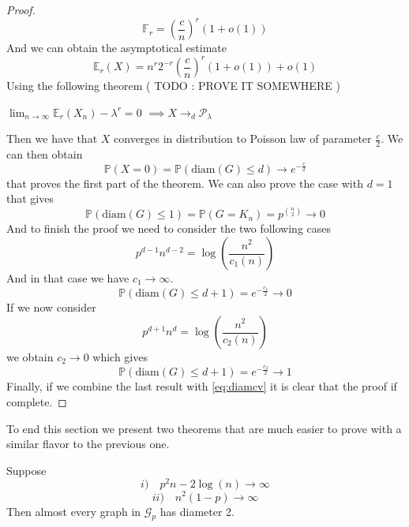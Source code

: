 \begin{proof}
	
	\begin{equation}
		\mathbb{F}_r = (\frac{c}{n})^r(1+o(1))
	\end{equation}
	And we can obtain the asymptotical estimate
	\begin{equation}
		\mathbb{E}_r(X) = n^r2^{-r}(\frac{c}{n})^r(1+o(1)) + o(1)
	\end{equation}
	Using the following theorem ( TODO : PROVE IT SOMEWHERE )
	\begin{theorem}
		$\lim_{n\to\infty} \mathbb{E}_r(X_n) - \lambda^r = 0$
			\newline
			$\implies X \longrightarrow_d \mathcal{P}_{\lambda}$
	\end{theorem}
	Then we have that $X$ converges in distribution to Poisson law of parameter $\frac{c}{2}$.
	\newline
	We can then obtain 
	\begin{equation}\label{eq:diamcv}
		\mathbb{P}(X=0) = \mathbb{P}(\text{diam}(G) \leq d) \longrightarrow e^{-\frac{c}{2}}
	\end{equation}
	that proves the first part of the theorem. We can also prove the case with $d=1$ that gives
	\begin{equation}
		\mathbb{P}(\text{diam}(G) \leq 1) = \mathbb{P}(G = K_n) = p^{\binom{n}{2}} \longrightarrow 0
	\end{equation}
	And to finish the proof we need to consider the two following cases
	\begin{equation}
		p^{d-1}n^{d-2} = \log(\frac{n^2}{c_1(n)})
	\end{equation}
	And in that case we have $c_1 \longrightarrow \infty$.
	\begin{equation}
		\mathbb{P}(\text{diam}(G) \leq d+1) = e^{-\frac{c_1}{2}} \longrightarrow 0
	\end{equation}
	If we now consider
	\begin{equation}
		p^{d+1}n^d = \log(\frac{n^2}{c_2(n)})
	\end{equation}
	we obtain $c_2 \longrightarrow 0$ which gives
	\begin{equation}
		\mathbb{P}(\text{diam}(G) \leq d+1) = e^{-\frac{c_2}{2}} \longrightarrow 1
	\end{equation}
	Finally, if we combine the last result with \ref{eq:diamcv} it is clear that the proof if complete.
\end{proof}
	To end this section we present two theorems that are much easier to prove with a similar flavor to the previous one.
	\begin{theorem}\label{th:diam2}
	Suppose 
	\begin{equation}
		i) \quad p^2n - 2\log(n) \longrightarrow \infty
	\end{equation}
	\begin{equation}
		ii) \quad n^2(1-p) \longrightarrow \infty
	\end{equation}
	Then almost every graph in $\mathcal{G}_p$ has diameter 2.
\end{theorem}

